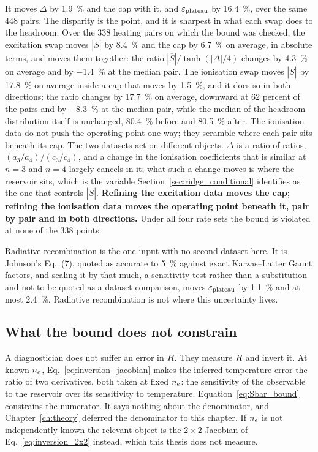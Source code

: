 It moves $\Delta$ by \SI{1.9}{\percent} and the cap with it, and $\varepsilon_{\mathrm{plateau}}$
by \SI{16.4}{\percent}, over the same $448$ pairs. The disparity is the point,
and it is sharpest in what each swap does to the headroom. Over the $338$
heating pairs on which the bound was checked, the excitation swap moves
$|\overline{S}|$ by \SI{8.4}{\percent} and the cap by \SI{6.7}{\percent} on
average, in absolute terms, and moves them together: the ratio
$|\overline{S}|/\tanh(|\Delta|/4)$ changes by \SI{4.3}{\percent} on average
and by \SI{-1.4}{\percent} at the median pair. The ionisation swap moves
$|\overline{S}|$ by \SI{17.8}{\percent} on average inside a cap that moves by
\SI{1.5}{\percent}, and it does so in both directions: the ratio changes by
\SI{17.7}{\percent} on average, downward at $62$ percent of the pairs and by
\SI{-8.3}{\percent} at the median pair, while the median of the headroom
distribution itself is unchanged, \SI{80.4}{\percent} before and
\SI{80.5}{\percent} after. The ionisation data do not push the operating
point one way; they scramble where each pair sits beneath its cap. The two
datasets act on different objects. $\Delta$ is a ratio of ratios,
$(a_3/a_4)/(c_3/c_4)$, and a change in the ionisation coefficients that is
similar at $n=3$ and $n=4$ largely cancels in it; what such a change moves is
where the reservoir sits, which is the variable
Section~\ref{sec:ridge_conditional} identifies as the one that controls
$|\overline{S}|$. \textbf{Refining the excitation data moves the cap;
refining the ionisation data moves the operating point beneath it, pair by
pair and in both directions.}
Under all four rate sets the bound is violated at none of the $338$ points.

Radiative recombination is the one input with no second dataset here. It is
Johnson's Eq.~(7), quoted as accurate to \SI{5}{\percent} against exact
Karzas--Latter Gaunt factors, and scaling it by that much, a sensitivity
test rather than a substitution and not to be quoted as a dataset comparison,
moves $\varepsilon_{\mathrm{plateau}}$ by \SI{1.1}{\percent} and at most \SI{2.4}{\percent}.
Radiative recombination is not where this uncertainty lives.

\subsection{What the bound does not constrain}
\label{sec:inversion_jacobian}

A diagnostician does not suffer an error in $R$. They measure $R$ and
invert it. At known $n_e$, Eq.~\eqref{eq:inversion_jacobian} makes the inferred
temperature error the ratio of two derivatives, both taken at fixed $n_e$:
the sensitivity of the observable to the reservoir over its sensitivity to
temperature. Equation~\eqref{eq:Sbar_bound} constrains the numerator. It says
nothing about the denominator, and Chapter~\ref{ch:theory} deferred the
denominator to this chapter. If $n_e$ is not independently known the relevant
object is the $2\times2$ Jacobian of Eq.~\eqref{eq:inversion_2x2} instead, which
this thesis does not measure.

